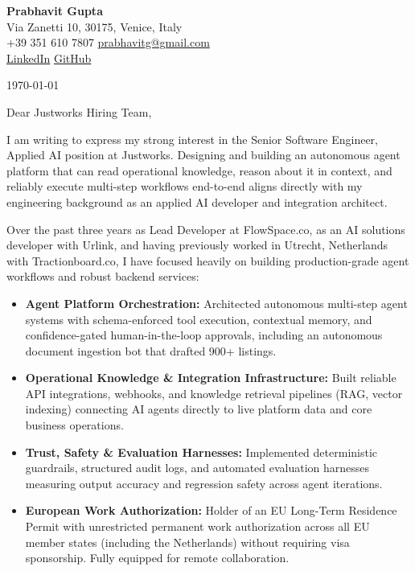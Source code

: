 \documentclass[11pt,a4paper]{article}
\begin{document}
\begin{center}
    {\huge \textbf{Prabhavit Gupta}} \\
    \vspace{4pt}
    Via Zanetti 10, 30175, Venice, Italy \\
    +39 351 610 7807 \textbar{} \href{mailto:prabhavitg@gmail.com}{prabhavitg@gmail.com} \\
    \href{https://www.linkedin.com/in/prabhavit/}{LinkedIn} \textbar{} \href{https://github.com/prab-gupta}{GitHub}
\end{center}

\vspace{10pt}

\noindent \today

\vspace{6pt}

\noindent Dear Justworks Hiring Team,

\vspace{6pt}

\noindent I am writing to express my strong interest in the Senior Software Engineer, Applied AI position at Justworks. Designing and building an autonomous agent platform that can read operational knowledge, reason about it in context, and reliably execute multi-step workflows end-to-end aligns directly with my engineering background as an applied AI developer and integration architect.

\vspace{6pt}

\noindent Over the past three years as Lead Developer at FlowSpace.co, as an AI solutions developer with Urlink, and having previously worked in Utrecht, Netherlands with Tractionboard.co, I have focused heavily on building production-grade agent workflows and robust backend services:

\begin{itemize}[leftmargin=*]
    \item \textbf{Agent Platform Orchestration:} Architected autonomous multi-step agent systems with schema-enforced tool execution, contextual memory, and confidence-gated human-in-the-loop approvals, including an autonomous document ingestion bot that drafted 900+ listings.
    \item \textbf{Operational Knowledge \& Integration Infrastructure:} Built reliable API integrations, webhooks, and knowledge retrieval pipelines (RAG, vector indexing) connecting AI agents directly to live platform data and core business operations.
    \item \textbf{Trust, Safety \& Evaluation Harnesses:} Implemented deterministic guardrails, structured audit logs, and automated evaluation harnesses measuring output accuracy and regression safety across agent iterations.
    \item \textbf{European Work Authorization:} Holder of an EU Long-Term Residence Permit with unrestricted permanent work authorization across all EU member states (including the Netherlands) without requiring visa sponsorship. Fully equipped for remote collaboration.
\end{itemize}
\end{document}
